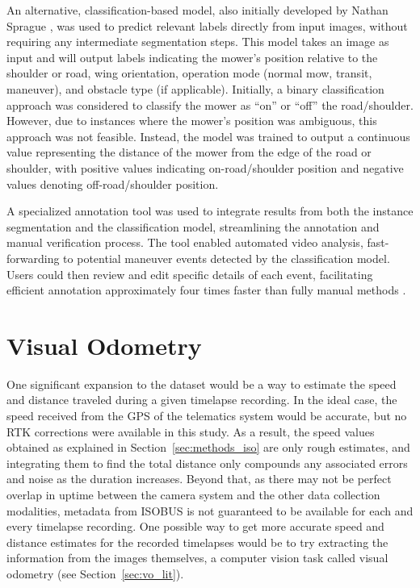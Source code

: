 \documentclass[
]{article}
\begin{document}
An alternative, classification-based model, also initially developed by
Nathan Sprague \parencite{Sprague_ProgramAnnotateVideos_2024}, was used
to predict relevant labels directly from input images, without requiring
any intermediate segmentation steps. This model takes an image as input
and will output labels indicating the mower's position relative to the
shoulder or road, wing orientation, operation mode (normal mow, transit,
maneuver), and obstacle type (if applicable). Initially, a binary
classification approach was considered to classify the mower as ``on''
or ``off'' the road/shoulder. However, due to instances where the
mower's position was ambiguous, this approach was not feasible. Instead,
the model was trained to output a continuous value representing the
distance of the mower from the edge of the road or shoulder, with
positive values indicating on-road/shoulder position and negative values
denoting off-road/shoulder position.

A specialized annotation tool
\parencite{Sprague_ProgramAnnotateVideos_2024} was used to integrate
results from both the instance segmentation and the classification
model, streamlining the annotation and manual verification process. The
tool enabled automated video analysis, fast-forwarding to potential
maneuver events detected by the classification model. Users could then
review and edit specific details of each event, facilitating efficient
annotation approximately four times faster than fully manual methods
\parencite{Mardikes_FutureRoadsideMowing_2025}.

\section{Visual Odometry}\label{sec:methods_vo}

One significant expansion to the dataset would be a way to estimate the
speed and distance traveled during a given timelapse recording. In the
ideal case, the speed received from the GPS of the telematics system
would be accurate, but no RTK corrections were available in this study.
As a result, the speed values obtained as explained in
Section~\ref{sec:methods_iso} are only rough estimates, and integrating
them to find the total distance only compounds any associated errors and
noise as the duration increases. Beyond that, as there may not be
perfect overlap in uptime between the camera system and the other data
collection modalities, metadata from ISOBUS is not guaranteed to be
available for each and every timelapse recording. One possible way to
get more accurate speed and distance estimates for the recorded
timelapses would be to try extracting the information from the images
themselves, a computer vision task called visual odometry (see
Section~\ref{sec:vo_lit}).
\end{document}
